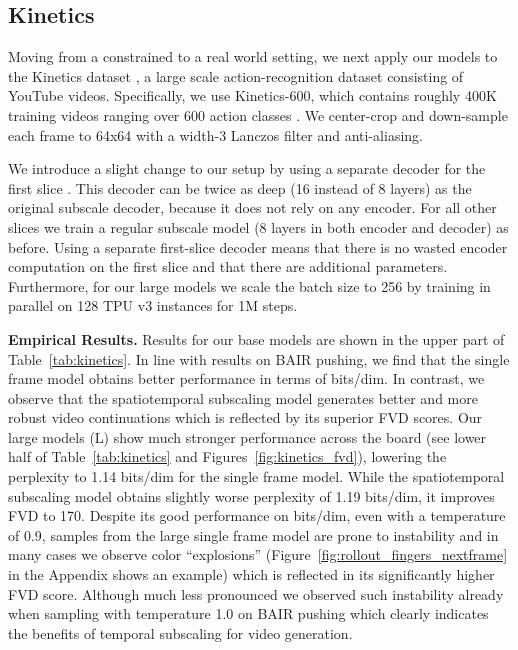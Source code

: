 \documentclass{article} \usepackage{iclr2020_conference,times}
\begin{document}
\subsection{Kinetics}\label{sec:kinetics}


Moving from a constrained to a real world setting, we next apply our models to the Kinetics dataset \citep{Kay2017TheKH}, a large scale action-recognition dataset consisting of YouTube videos. Specifically, we use Kinetics-600, which contains roughly 400K training videos ranging over 600 action classes \citep{Carreira2018ASN}. We center-crop and down-sample each frame to 64x64 with a width-3 Lanczos filter and anti-aliasing.

We introduce a slight change to our setup by using a separate decoder for the first slice . This decoder can be twice as deep (16 instead of 8 layers) as the original subscale decoder, because it does not rely on any encoder. For all other slices we train a regular subscale model (8 layers in both encoder and decoder) as before. Using a separate first-slice decoder means that there is no wasted encoder computation on the first slice and that there are additional parameters.
Furthermore, for our large models we scale the batch size to 256 by training in parallel on 128 TPU v3 instances for 1M steps.

\textbf{Empirical Results.}
Results for our base models are shown in the upper part of Table~\ref{tab:kinetics}.
In line with results on BAIR pushing, we find that the single frame model obtains better performance in terms of bits/dim. In contrast, we observe that the spatiotemporal subscaling model generates better and more robust video continuations which is reflected by its superior FVD scores.
Our large models (L) show much stronger performance across the board (see lower half of Table~\ref{tab:kinetics} and Figures~\ref{fig:kinetics_fvd}), lowering the perplexity to 1.14 bits/dim for the single frame model. While the spatiotemporal subscaling model obtains slightly worse perplexity of 1.19 bits/dim, it improves FVD to 170. Despite its good performance on bits/dim, even with a temperature of 0.9, samples from the large single frame model are prone to instability and in many cases we observe color ``explosions'' (Figure~\ref{fig:rollout_fingers_nextframe} in the Appendix shows an example) which is reflected in its significantly higher FVD score. Although much less pronounced we observed such instability already when sampling with temperature 1.0 on BAIR pushing which clearly indicates the benefits of temporal subscaling for video generation.
\end{document}
